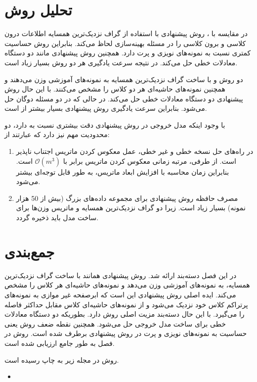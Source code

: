 \section{تحلیل روش }\label{sec:3:4}
در مقایسه با ، روش پیشنهادی با استفاده از گراف نزدیک‌ترین همسایه اطلاعات درون کلاسی و برون کلاسی را در مسئله بهینه‌سازی لحاظ می‌کند. بنابراین روش  حساسیت کمتری نسبت به نمونه‌های نویزی و پرت دارد. همچنین روش پیشنهادی مانند  دو دستگاه معادلات خطی حل می‌کند. در نتیجه سرعت یادگیری هر دو روش بسیار زیاد است.

دو روش  و  با ساخت گراف نزدیک‌ترین همسایه به نمونه‌های آموزشی وزن می‌دهند و همچنین نمونه‌های حاشیه‌ای هر دو کلاس را مشخص می‌کنند. با این حال روش پیشنهادی دو دستگاه معادلات خطی حل می‌کند. در حالی که در  دو مسئله دوگان حل می‌شود. بنابراین سرعت یادگیری روش پیشنهادی بسیار بیشتر از  است.

با وجود اینکه مدل خروجی در روش پیشنهادی دقت بیشتری نسبت به  دارد، دو محدودیت مهم نیز دارد که عبارتند از:
\begin{enumerate}
	\item در راه‌های حل نسخه خطی و غیر خطی، عمل معکوس کردن ماتریس اجتناب ناپذیر است. از طرفی، مرتبه زمانی معکوس کردن ماتریس برابر با  $\mathcal{O}({{m}^{3}})$ است. بنابراین زمان محاسبه با افزایش ابعاد ماتریس، به طور قابل توجه‌ای بیشتر می‌شود.
	\item مصرف حافظه روش پیشنهادی برای مجموعه داده‌های بزرگ (بیش از 50 هزار نمونه) بسیار زیاد است. زیرا دو گراف نزدیک‌ترین همسایه و ماتریس وزن‌ها برای ساخت مدل باید ذخیره گردد.
\end{enumerate}

\section{جمع‌بندی}\label{sec:3:5}
در این فصل دسته‌بند  ارائه شد. روش پیشنهادی همانند  با ساخت گراف نزدیک‌ترین همسایه، به نمونه‌های آموزشی وزن می‌دهد و نمونه‌های حاشیه‌ای هر کلاس را مشخص می‌کند. ایده اصلی روش پیشنهادی این است که ابرصفحه غیر موازی به نمونه‌های پرتراکم کلاس خود نزدیک می‌شود و از نمونه‌های حاشیه‌ای کلاس مقابل حداکثر فاصله را می‌گیرد. با این حال دسته‌بند  مزیت اصلی روش  دارد. بطوریکه دو دستگاه معادلات خطی برای ساخت مدل خروجی حل می‌شود. همچنین نقطه ضعف روش  یعنی حساسیت به نمونه‌های نویزی و پرت در روش پیشنهادی برطرف شده است. روش  در فصل به طور جامع ارزیابی شده است.

روش  در مجله زیر به چاپ رسیده است.
\begin{LTR}
\begin{itemize}[label=$\bullet$]
	\item {}
\end{itemize}
\end{LTR}
